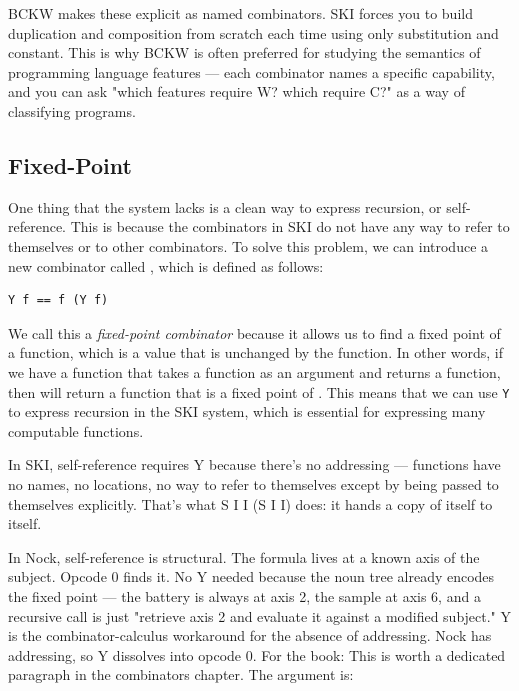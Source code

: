 BCKW makes these explicit as named combinators. SKI forces you to build duplication and composition from scratch each time using only substitution and constant. This is why BCKW is often preferred for studying the semantics of programming language features — each combinator names a specific capability, and you can ask "which features require W? which require C?" as a way of classifying programs.


\subsection{ Fixed-Point}

One thing that the  system lacks is a clean way to express recursion, or self-reference.  This is because the combinators in \textsc{SKI} do not have any way to refer to themselves or to other combinators.  To solve this problem, we can introduce a new combinator called , which is defined as follows:

\begin{lstlisting}[style=listingcomb,frame=tb]
Y f == f (Y f)
\end{lstlisting}

We call this a \emph{fixed-point combinator} because it allows us to find a fixed point of a function, which is a value that is unchanged by the function.  In other words, if we have a function  that takes a function as an argument and returns a function, then  will return a function that is a fixed point of .  This means that we can use \texttt{Y} to express recursion in the \textsc{SKI} system, which is essential for expressing many computable functions.

In SKI, self-reference requires Y because there's no addressing — functions have no names, no locations, no way to refer to themselves except by being passed to themselves explicitly. That's what S I I (S I I) does: it hands a copy of itself to itself.


In Nock, self-reference is structural. The formula lives at a known axis of the subject. Opcode 0 finds it. No Y needed because the noun tree already encodes the fixed point — the battery is always at axis 2, the sample at axis 6, and a recursive call is just "retrieve axis 2 and evaluate it against a modified subject." Y is the combinator-calculus workaround for the absence of addressing. Nock has addressing, so Y dissolves into opcode 0.
For the book:
This is worth a dedicated paragraph in the combinators chapter. The argument is:

